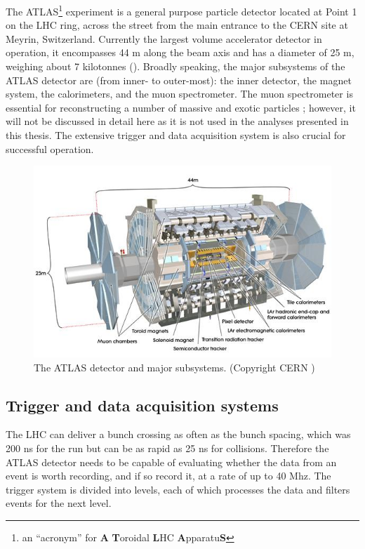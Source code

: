 The ATLAS\footnote{an ``acronym'' for \textbf{A} \textbf{T}oroidal \textbf{L}HC \textbf{A}pparatu\textbf{S}} experiment is a general purpose particle detector \cite{Aad:2008zzm} located at Point 1 on the LHC ring, across the street from the main entrance to the CERN site at Meyrin, Switzerland.
Currently the largest volume accelerator detector in operation, it encompasses 44 m along the beam axis and has a diameter of 25 m, weighing about 7 kilotonnes ().
Broadly speaking, the major subsystems of the ATLAS detector are (from inner- to outer-most): the inner detector, the magnet system, the calorimeters, and the muon spectrometer.
The muon spectrometer is essential for reconstructing a number of massive and exotic particles \cite{ATLAS:1997ad}; however, it will not be discussed in detail here as it is not used in the analyses presented in this thesis.
The extensive trigger and data acquisition system is also crucial for successful operation. %

\begin{figure}[t]
\includegraphics{ATLAS_layout.jpg}
\caption{The ATLAS detector and major subsystems. (Copyright CERN \cite{Pequenao:1095924})}
\label{fig:atlas_layout}
\end{figure}


\subsection{Trigger and data acquisition systems}
\label{subsec:atlas_trigger} %

The LHC can deliver a bunch crossing as often as the bunch spacing, which was 200 ns for the \pPb run but can be as rapid as 25 ns for \pp collisions.
Therefore the ATLAS detector needs to be capable of evaluating whether the data from an event is worth recording, and if so record it, at a rate of up to 40 Mhz.
The trigger system is divided into levels, each of which processes the data and filters events for the next level.

